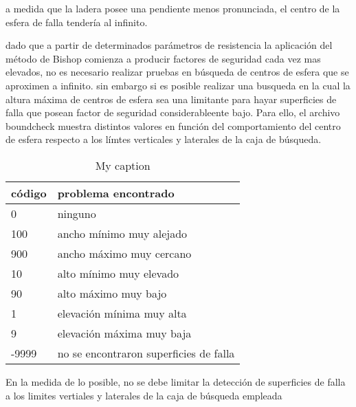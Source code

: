 a medida que la ladera posee una pendiente menos pronunciada, el centro de la esfera de falla tendería al infinito.

dado que a partir de determinados parámetros de resistencia la aplicaci\'on del m\'etodo de Bishop comienza a producir factores de seguridad cada vez mas elevados, no es necesario realizar pruebas en b\'usqueda de centros de esfera que se aproximen a infinito.
sin embargo si es posible realizar una busqueda en la cual la altura m\'axima de centros de esfera sea una limitante para hayar superficies de falla que posean factor de seguridad  considerableente bajo. Para ello, el archivo boundcheck muestra distintos valores en funci\'on del comportamiento del centro de esfera respecto a los l\'imtes verticales y laterales de la caja de b\'usqueda.

\begin{table}[]
\centering
\caption{My caption}
\label{my-label}
\begin{tabular}{ll}
\hline
\multicolumn{1}{|l|}{\textbf{c\'odigo}} & \multicolumn{1}{l|}{\textbf{problema encontrado}} \\ \hline
0                                     & ninguno                                           \\
100                                   & ancho m\'inimo muy alejado                          \\
900                                   & ancho m\'aximo muy cercano                          \\
10                                    & alto m\'inimo muy elevado                           \\
90                                    & alto m\'aximo muy bajo                              \\
1                                     & elevaci\'on m\'inima muy alta                         \\
9                                     & elevaci\'on m\'axima muy baja                         \\
-9999                                 & no se encontraron superficies de falla           
\end{tabular}
\label{boundcheckTable}
\end{table}

En la medida de lo posible, no se debe limitar la detecci\'on de superficies de falla a los limites vertiales y laterales de la caja de b\'usqueda empleada
